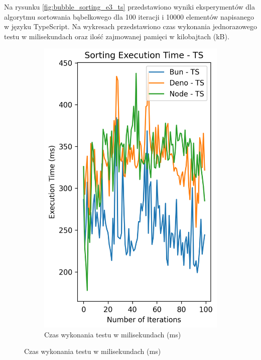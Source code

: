 Na rysunku \ref{fig:bubble_sorting_e3_ts} przedstawiono wyniki eksperymentów dla algorytmu sortowania bąbelkowego dla 100 iteracji i 10000 elementów napisanego w języku TypeScript. Na wykresach przedstawiono czas wykonania jednorazowego testu w milisekundach oraz ilość zajmowanej pamięci w kilobajtach (kB).

\begin{figure}[H]
  \centering
  \begin{subfigure}[b]{0.44\textwidth}
    \centering
    \includegraphics[width=\textwidth]{Figures/sorting/sorting_bubble_100_10000_ts_time.png}
    \caption{Czas wykonania testu w milisekundach (ms)}
    \label{fig:bubble_sorting_e3_ts_time}

\end{subfigure}
\end{figure}
